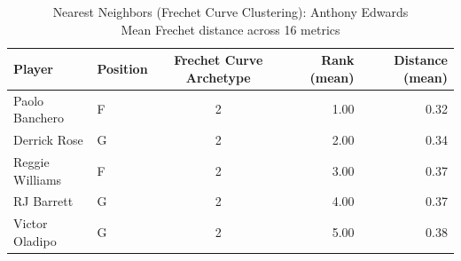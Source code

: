 \begin{table}[t]
\caption*{
{\fontsize{20}{25} Nearest Neighbors (Frechet Curve Clustering): Anthony Edwards\fontsize{12}{15}\selectfont } \\ 
{\fontsize{14}{17}\selectfont  Mean Frechet distance across 16 metrics\fontsize{12}{15}\selectfont }
} 
\fontsize{12.0pt}{14.0pt}\selectfont
\begin{tabular*}{\linewidth}{@{\extracolsep{\fill}}llcrr}
\toprule
Player & Position & Frechet Curve Archetype & Rank (mean) & Distance (mean) \\ 
\midrule\addlinespace[2.5pt]
Paolo Banchero & F & 2 & 1.00 & 0.32 \\ 
Derrick Rose & G & 2 & 2.00 & 0.34 \\ 
Reggie Williams & F & 2 & 3.00 & 0.37 \\ 
RJ Barrett & G & 2 & 4.00 & 0.37 \\ 
Victor Oladipo & G & 2 & 5.00 & 0.38 \\ 
\bottomrule
\end{tabular*}
\end{table}

